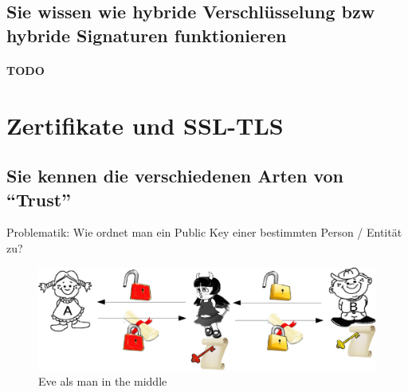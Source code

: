 \documentclass[10pt,a4paper]{article}
\begin{document}
\subsection*{Sie wissen wie hybride Verschlüsselung bzw hybride Signaturen funktionieren}

\paragraph*{TODO}

\section{Zertifikate und SSL-TLS}

\subsection*{Sie kennen die verschiedenen Arten von "`Trust"'}
Problematik: Wie ordnet man ein Public Key einer bestimmten Person / Entität zu?
\begin{figure}[H]
    \begin{center}
    \includegraphics[width=14cm]{images/mitma.png}
    \caption{Eve als man in the middle}
    \label{mitma}
    \end{center}
\end{figure}
\end{document}
